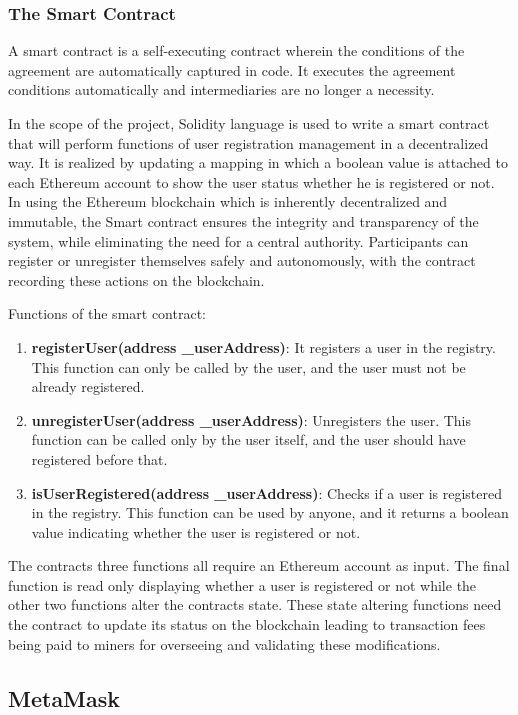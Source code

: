 \subsubsection{The Smart Contract}

A smart contract is a self-executing contract wherein the conditions of the agreement are automatically captured in code. It executes the agreement conditions automatically 
and intermediaries are no longer a necessity. 

In the scope of the project, Solidity language is used to write a smart contract that will perform functions of user registration management in a decentralized way. It is 
realized by updating a mapping in which a boolean value is attached to each Ethereum account to show the user status whether he is registered or not. In using the Ethereum 
blockchain which is inherently decentralized and immutable, the Smart contract ensures the integrity and transparency of the system, while eliminating the need for a central
authority. Participants can register or unregister themselves safely and autonomously, with the contract recording these actions on the blockchain. 

Functions of the smart contract:

\begin{enumerate}
  \item \textbf{registerUser(address \_userAddress)}: It registers a user in the registry. This function can only be called by the user, and the user must not be already registered.
  \item \textbf{unregisterUser(address \_userAddress)}: Unregisters the user. This function can be called only by the user itself, and the user should have registered before that.
  \item \textbf{isUserRegistered(address \_userAddress)}: Checks if a user is registered in the registry. This function can be used by anyone, and it returns a boolean 
  value indicating whether the user is registered or not.
\end{enumerate}

The contracts three functions all require an Ethereum account as input. The final function is read only displaying whether a user is registered or not while the other two 
functions alter the contracts state. These state altering functions need the contract to update its status on the blockchain leading to transaction fees being paid to 
miners for overseeing and validating these modifications.

\subsection{MetaMask}

